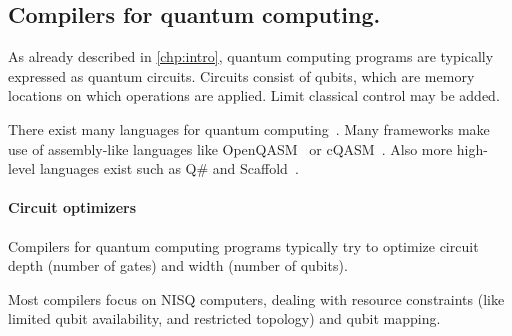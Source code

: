 
\subsection{Compilers for quantum computing.}
\label{compiler:sec:compilers-qc}
As already described in \cref{chp:intro}, quantum computing programs are typically expressed as quantum circuits.
Circuits consist of qubits, which are memory locations on which operations are applied.
Limit classical control may be added.

There exist many languages for quantum computing~\cite{chong_programming_2017, heim_quantum_2020}.
Many frameworks make use of assembly-like languages like OpenQASM~\cite{cross_open_2017} or cQASM~\cite{khammassi_cqasm_2018}.
Also more high-level languages exist such as Q\# and Scaffold~\cite{svore_q_2018, litteken_updated_2020, heim_quantum_2020}.

\paragraph{Circuit optimizers}
Compilers for quantum computing programs typically try to optimize circuit depth (number of gates) and width (number of qubits).

Most compilers focus on \ac{NISQ} computers, dealing with resource constraints (like limited qubit availability, and restricted topology)\cite{chong_programming_2017, murali_full-stack_2019, bandic_full-stack_2022} and qubit mapping\cite{li_tackling_2019, zhang_context-sensitive_2020, bandic_mapping_2023, nishio_extracting_2020}.

